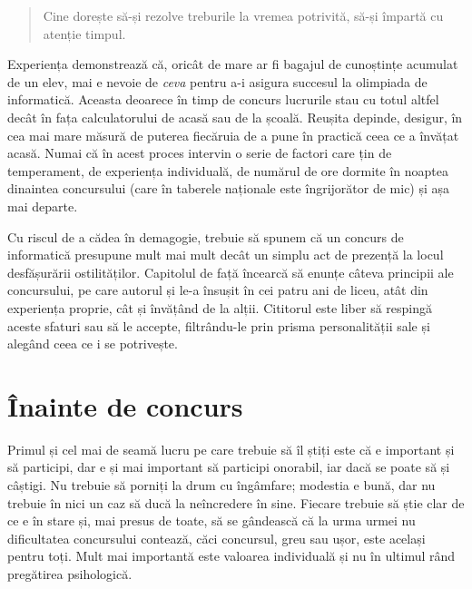 

\begin{quote}
  Cine dorește să-și rezolve treburile la vremea potrivită, să-și împartă
  cu atenție timpul. \\
\end{quote}

Experiența demonstrează că, oricât de mare ar fi bagajul de cunoștințe
acumulat de un elev, mai e nevoie de {\it ceva} pentru a-i asigura succesul la
olimpiada de informatică. Aceasta deoarece în timp de concurs lucrurile stau
cu totul altfel decât în fața calculatorului de acasă sau de la
școală. Reușita depinde, desigur, în cea mai mare măsură de puterea fiecăruia
de a pune în practică ceea ce a învățat acasă. Numai că în acest proces
intervin o serie de factori care țin de temperament, de experiența
individuală, de numărul de ore dormite în noaptea dinaintea concursului (care
în taberele naționale este îngrijorător de mic) și așa mai departe.

Cu riscul de a cădea în demagogie, trebuie să spunem că un concurs de
informatică presupune mult mai mult decât un simplu act de prezență la locul
desfășurării ostilităților. Capitolul de față încearcă să enunțe câteva
principii ale concursului, pe care autorul și le-a însușit în cei patru ani de
liceu, atât din experiența proprie, cât și învățând de la alții. Cititorul
este liber să respingă aceste sfaturi sau să le accepte, filtrându-le prin
prisma personalității sale și alegând ceea ce i se potrivește.

\section{Înainte de concurs}

Primul și cel mai de seamă lucru pe care trebuie să îl știți este că e
important și să participi, dar e și mai important să participi onorabil, iar
dacă se poate să și câștigi. Nu trebuie să porniți la drum cu îngâmfare;
modestia e bună, dar nu trebuie în nici un caz să ducă la neîncredere în
sine. Fiecare trebuie să știe clar de ce e în stare și, mai presus de toate,
să se gândească că la urma urmei nu dificultatea concursului contează, căci
concursul, greu sau ușor, este același pentru toți. Mult mai importantă este
valoarea individuală și nu în ultimul rând pregătirea psihologică.

